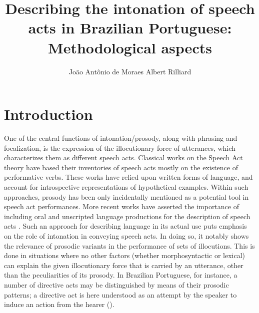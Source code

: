 \documentclass[output=paper]{LSP/langsci}
\author{João Antônio de Moraes\affiliation{Universidade Federal do Rio de Janeiro, CNPq}\lastand 
Albert Rilliard\affiliation{LIMSI, CNRS, Université Paris-Saclay}
}
\title{Describing the intonation of speech acts in Brazilian Portuguese: Methodological aspects}
\begin{document}
\label{chap:mor}\label{ch:7}

\section{Introduction} 
\label{introduction}



One of the central functions of intonation/prosody, along with phrasing and focalization, is the expression of the illocutionary force of utterances, which characterizes them as different speech acts. 
Classical works on the Speech Act theory \citep{Austin1962,Searle1969,Vanderveken1990,Alston2000} have based their inventories of speech acts mostly on the existence of performative verbs. 
These works have relied upon written forms of language, and account for introspective representations of hypothetical examples. 
Within such approaches, prosody has been only incidentally mentioned as a potential tool in speech act performances. 
More recent works have asserted the importance of including oral and unscripted language productions for the description of speech acts \citep{Cresti2000,Moneglia2011,Raso2012,TamotoAndKawabata}.  
Such an approach for describing language in its actual use puts emphasis on the role of intonation in conveying speech acts. 
In doing so, it notably shows the relevance of prosodic variants in the performance of sets of illocutions. 
This is done in situations where no other factors (whether morphosyntactic or lexical) can explain the given illocutionary force that is carried by an utterance, other than the peculiarities of its prosody.
In Brazilian Portuguese, for instance, a number of directive acts may be distinguished by means of their prosodic patterns; a directive act is here understood as an attempt by the speaker to induce an action from the hearer (\citealt{Searle1979}).%
\end{document}
